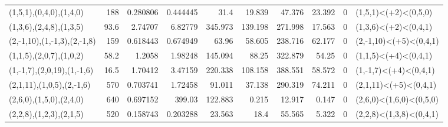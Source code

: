 \begin{tabular}{lrrrrrrrrl}
 (1,5,1),(0,4,0),(1,4,0)     &  188   &  0.280806 &    0.444445 &       31.4   &     19.839 &           47.376 &         23.392 &        0 & (1,5,1)<(+2)<(0,5,0)    \\
 (1,3,6),(2,4,8),(1,3,5)     &   93.6 &  2.74707  &    6.82779  &      345.973 &    139.198 &          271.998 &         17.563 &        0 & (1,3,6)<(+2)<(0,4,1)    \\
 (2,-1,10),(1,-1,3),(2,-1,8) &  159   &  0.618443 &    0.674949 &       63.96  &     58.605 &          238.716 &         62.177 &        0 & (2,-1,10)<(+5)<(0,4,1)  \\
 (1,1,5),(2,0,7),(1,0,2)     &   58.2 &  1.2058   &    1.98248  &      145.094 &     88.25  &          322.879 &         54.25  &        0 & (1,1,5)<(+4)<(0,4,1)    \\
 (1,-1,7),(2,0,19),(1,-1,6)  &   16.5 &  1.70412  &    3.47159  &      220.338 &    108.158 &          388.551 &         58.572 &        0 & (1,-1,7)<(+4)<(0,4,1)   \\
 (2,1,11),(1,0,5),(2,-1,6)   &  570   &  0.703741 &    1.72458  &       91.011 &     37.138 &          290.319 &         74.211 &        0 & (2,1,11)<(+5)<(0,4,1)   \\
 (2,6,0),(1,5,0),(2,4,0)     &  640   &  0.697152 &  399.03     &      122.883 &      0.215 &           12.917 &          0.147 &        0 & (2,6,0)<(1,6,0)<(0,5,0) \\
 (2,2,8),(1,2,3),(2,1,5)     &  520   &  0.158743 &    0.203288 &       23.563 &     18.4   &           55.565 &          5.322 &        0 & (2,2,8)<(1,3,8)<(0,4,1) \\
\hline
\end{tabular}